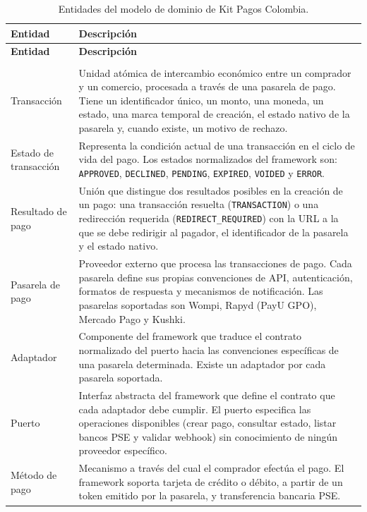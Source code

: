 \begin{longtable}{|l|p{}|}
  \hline
  \textbf{Entidad} & \textbf{Descripción} \\
  \hline
  \endfirsthead
  \hline
  \textbf{Entidad} & \textbf{Descripción} \\
  \hline
  \endhead
  \hline
  \endfoot
  \caption{Entidades del modelo de dominio de Kit Pagos Colombia.}
  \label{tab:entidades-dominio}\\
  \endlastfoot
  Transacción & Unidad atómica de intercambio económico entre un comprador y un comercio, procesada a través de una pasarela de pago. Tiene un identificador único, un monto, una moneda, un estado, una marca temporal de creación, el estado nativo de la pasarela y, cuando existe, un motivo de rechazo. \\
  \hline
  Estado de transacción & Representa la condición actual de una transacción en el ciclo de vida del pago. Los estados normalizados del framework son: \texttt{APPROVED}, \texttt{DECLINED}, \texttt{PENDING}, \texttt{EXPIRED}, \texttt{VOIDED} y \texttt{ERROR}. \\
  \hline
  Resultado de pago & Unión que distingue dos resultados posibles en la creación de un pago: una transacción resuelta (\texttt{TRANSACTION}) o una redirección requerida (\texttt{REDIRECT\_REQUIRED}) con la URL a la que se debe redirigir al pagador, el identificador de la pasarela y el estado nativo. \\
  \hline
  Pasarela de pago & Proveedor externo que procesa las transacciones de pago. Cada pasarela define sus propias convenciones de API, autenticación, formatos de respuesta y mecanismos de notificación. Las pasarelas soportadas son Wompi, Rapyd (PayU GPO), Mercado Pago y Kushki. \\
  \hline
  Adaptador & Componente del framework que traduce el contrato normalizado del puerto hacia las convenciones específicas de una pasarela determinada. Existe un adaptador por cada pasarela soportada. \\
  \hline
  Puerto & Interfaz abstracta del framework que define el contrato que cada adaptador debe cumplir. El puerto especifica las operaciones disponibles (crear pago, consultar estado, listar bancos PSE y validar webhook) sin conocimiento de ningún proveedor específico. \\
  \hline
  Método de pago & Mecanismo a través del cual el comprador efectúa el pago. El framework soporta tarjeta de crédito o débito, a partir de un token emitido por la pasarela, y transferencia bancaria PSE. \\

\end{longtable}
